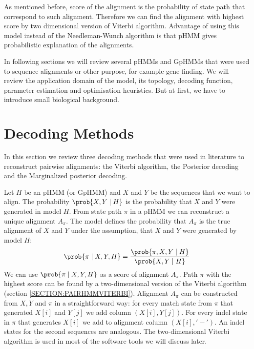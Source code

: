 As mentioned before, score of the alignment is the probability of state path
that correspond to such alignment. Therefore we can find the alignment with
highest score by two dimensional version of Viterbi algorithm. Advantage of
using this model instead of the Needleman-Wunch algorithm is that pHMM gives
probabilistic explanation of the alignments. 

In following sections we will review several pHMMs and GpHMMs that were used to
sequence alignments or other purpose, for example gene finding. We will review
the application domain of the model, its topology, decoding function, parameter
estimation and optimisation heuristics. But at first, we have to introduce small
biological background.


\section{Decoding Methods}

In this section we review three decoding methods that were used in literature to
reconstruct pairwise alignments: the Viterbi algorithm, the Posterior
decoding and the Marginalized posterior decoding.

Let $H$ be an pHMM (or GpHMM) and $X$ and $Y$ be the sequences that we want to
align. The probability $\prob{X,Y\mid H}$ is the probability that $X$ and $Y$
were generated in model $H$.  From state path $\pi$ in a pHMM  we can
reconstruct a unique alignment $A_{\pi}$. The model defines the probability 
that
$A_{\pi}$ is the true alignment of $X$ and $Y$ under the assumption, that $X$ and $Y$ were
generated by model $H$:
  \[\prob{\pi\mid
X,Y,H}=\frac{\prob{\pi,X,Y\mid H}}{\prob{X,Y\mid H}}\]
  We can use $\prob{\pi\mid X,Y,H}$ as a score of 
alignment $A_{\pi}$. Path $\pi$ with the highest score can be found by a
two-dimensional version of the Viterbi
algorithm (section \ref{SECTION:PAIRHMMVITERBI}). Alignment $A_{\pi}$ can be
constructed from $X,Y$ and $\pi$ in a straightforward
way: for every match state from $\pi$ that generated $X[i]$ and $Y[j]$ we add
column $(X[i],Y[j])$. For every indel state in $\pi$ that generates $X[i]$ we
add to alignment column $(X[i],'-')$. An indel states for the second sequences are
analogous.  The two-dimensional Viterbi algorithm is used in  most of the
software tools we will discuss later.


